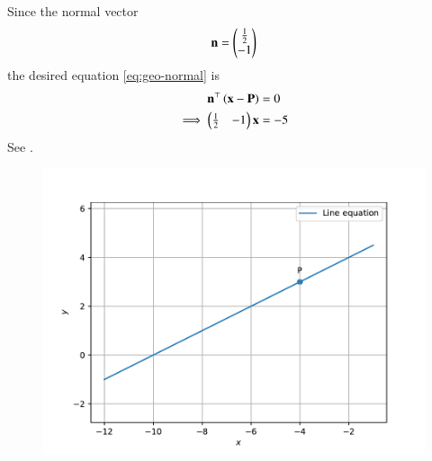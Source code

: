 Since the normal vector 
\begin{align}
\mathbf{n}=\begin{pmatrix}\frac{1}{2}\\ -1\end{pmatrix}\\
\end{align}
the desired equation \eqref{eq:geo-normal} is 
\begin{align}
\mathbf{n}^\top \left(\mathbf{x}-\mathbf{P}\right)&= 0 \\
\implies \begin{pmatrix}\frac{1}{2}&-1\end{pmatrix}{\mathbf{x}}&=-5
\end{align}
See 
		.
\begin{figure}[h]
\centering
\includegraphics[width=\columnwidth]{chapters/11/10/2/2/figs/fig.pdf}
\caption{}
		\label{fig:chapters/11/10/2/2/Figure}
\end{figure}
